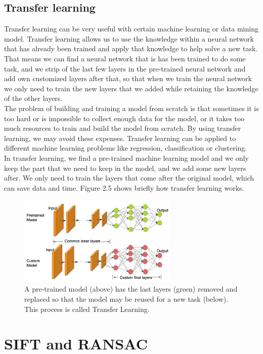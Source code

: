 \subsection{Transfer learning}
Transfer learning\cite{pratt1997second} can be very useful with certain machine learning or data mining model. Transfer learning allows us to use the knowledge within a neural network that has already been trained and apply that knowledge to help solve a new task. That means we can find a neural network that is has been trained to do some task, and we strip of the last few layers in the pre-trained neural network and add own customized layers after that, so that when we train the neural network we only need to train the new layers that we added while retaining the knowledge of the other layers.\\
The problem of building and training a model from scratch is that sometimes it is too hard or is impossible to collect enough data for the model, or it takes too much resources to train and build the model from scratch. By using transfer learning, we may avoid these expenses. Transfer learning can be applied to different machine learning problems like regression, classification or clustering.\\
In transfer learning, we find a pre-trained machine learning model and we only keep the part that we need to keep in the model, and we add some new layers after. We only need to train the layers that come after the original model, which can save data and time. Figure 2.5 shows briefly how transfer learning works.

\begin{figure}
  \centering
    \includegraphics[width=3.0in]{figs/transfer_learning}
    \caption{A pre-trained model (above) has the last layers (green) removed and replaced so that the model may be reused for a new task (below). This process is called Transfer Learning.\citep{TL}}
\end{figure}


\section{SIFT and RANSAC}

